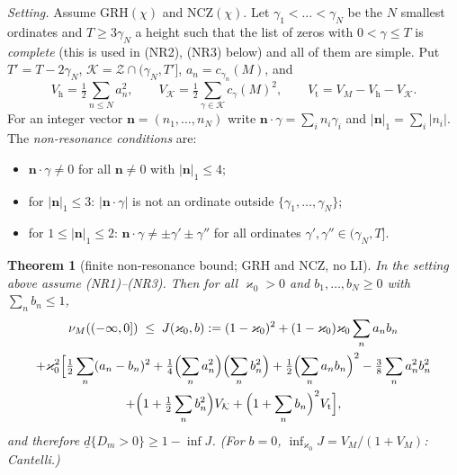 \documentclass[11pt]{amsart}
\newtheorem{theorem}{Theorem}[section]
\theoremstyle{definition}
\numberwithin{equation}{section}
\newcommand{\cZ}{\mathcal Z}          %
\newcommand{\cK}{\mathcal K}          %
\newcommand{\dlow}{\underline{d}}
\begin{document}
\emph{Setting.} Assume GRH$(\chi)$ and NCZ$(\chi)$. Let
$\gamma_1<\dots<\gamma_N$ be the $N$ smallest ordinates and
$T\ge3\gamma_N$ a height such that the list of zeros with
$0<\gamma\le T$ is \emph{complete} (this is used in (NR2), (NR3)
below) and all of them are simple. Put $T'=T-2\gamma_N$,
$\cK=\cZ\cap(\gamma_N,T']$, $a_n=c_{\gamma_n}(M)$, and
\[
V_{\mathrm h}=\tfrac12\sum_{n\le N}a_n^2,\qquad
V_{\cK}=\tfrac12\sum_{\gamma\in\cK}c_\gamma(M)^2,\qquad
V_{\mathrm t}=V_M-V_{\mathrm h}-V_{\cK}.
\]
For an integer vector $\mathbf n=(n_1,\dots,n_N)$ write
$\mathbf n\cdot\gamma=\sum_in_i\gamma_i$ and
$|\mathbf n|_1=\sum_i|n_i|$. The \emph{non-resonance conditions}
are:
\begin{itemize}
\item[(NR1)] $\mathbf n\cdot\gamma\ne0$ for all $\mathbf n\ne0$ with
$|\mathbf n|_1\le4$;
\item[(NR2)] for $|\mathbf n|_1\le3$: $|\mathbf n\cdot\gamma|$ is not
an ordinate outside $\{\gamma_1,\dots,\gamma_N\}$;
\item[(NR3)] for $1\le|\mathbf n|_1\le2$:
$\mathbf n\cdot\gamma\ne\pm\gamma'\pm\gamma''$ for all ordinates
$\gamma',\gamma''\in(\gamma_N,T]$.
\end{itemize}

\begin{theorem}[finite non-resonance bound; GRH and NCZ, no LI]
\label{thm:NR}
In the setting above assume \textup{(NR1)--(NR3)}. Then for all
$\varkappa_0>0$ and $b_1,\dots,b_N\ge0$ with $\sum_nb_n\le1$,
\begin{multline*}
\nu_M((-\infty,0])\;\le\;J(\varkappa_0,b):=(1-\varkappa_0)^2
+(1-\varkappa_0)\varkappa_0\sum_na_nb_n\\
+\varkappa_0^2\Bigl[\tfrac12\sum_n(a_n-b_n)^2
+\tfrac14\Bigl(\sum_na_n^2\Bigr)\Bigl(\sum_nb_n^2\Bigr)
+\tfrac12\Bigl(\sum_na_nb_n\Bigr)^2-\tfrac38\sum_na_n^2b_n^2\\
+\Bigl(1+\tfrac12\sum_nb_n^2\Bigr)V_{\cK}
+\Bigl(1+\sum_nb_n\Bigr)^2V_{\mathrm t}\Bigr],
\end{multline*}
and therefore $\dlow\{D_m>0\}\ge1-\inf J$. (For $b=0$,
$\inf_{\varkappa_0}J=V_M/(1+V_M)$: Cantelli.)
\end{theorem}
\end{document}
